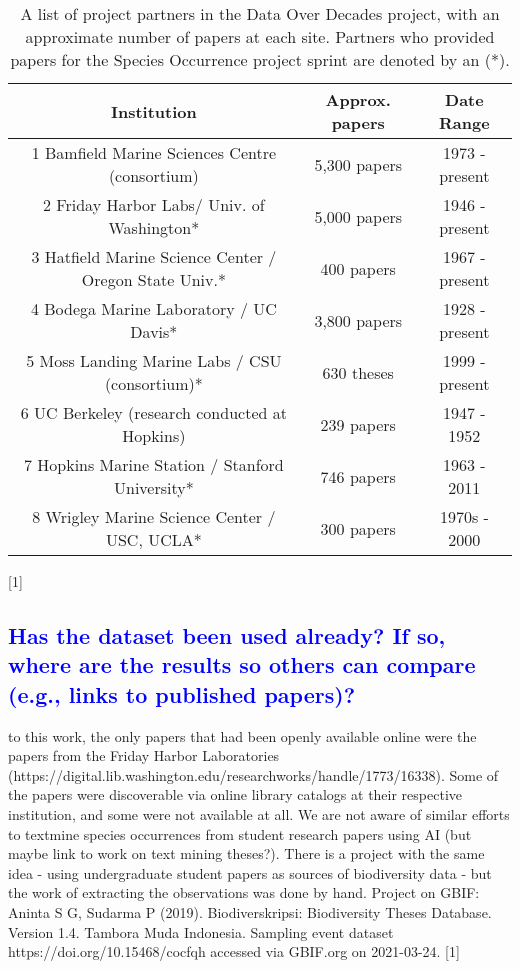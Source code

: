 \documentclass[letterpaper, 10 pt, conference]{ieeeconf}  %
\begin{document}
\begin{table}[h!]
\centering
 \begin{tabular}{||c c c||} 
 \hline
 Institution & Approx. papers & Date Range \\ [0.5ex] 
 \hline\hline
1 Bamfield Marine Sciences Centre (consortium) & 5,300 papers & 1973 - present \\
\hline
2 Friday Harbor Labs/ Univ. of Washington* & 5,000 papers & 1946 - present \\
\hline
3 Hatfield Marine Science Center / Oregon State Univ.* & 400 papers & 1967 - present \\
\hline
4 Bodega Marine Laboratory / UC Davis* & 3,800 papers & 1928 - present \\
\hline
5 Moss Landing Marine Labs / CSU (consortium)* & 630 theses & 1999 - present \\
\hline
6 UC Berkeley (research conducted at Hopkins) & 239 papers & 1947 - 1952 \\ 
\hline
7 Hopkins Marine Station / Stanford University* & 746 papers & 1963 - 2011 \\
\hline
8 Wrigley Marine Science Center / USC, UCLA* & 300 papers & 1970s - 2000 \\
\hline
\end{tabular}
\caption{A list of project partners in the Data Over Decades project, with an approximate number of papers at each site. Partners who provided papers for the Species Occurrence project sprint are denoted by an (*).}
\label{table:1}
\end{table}
[1]

\textcolor{blue}{\subsection{Has the dataset been used already? If so, where are the results so others can compare
(e.g., links to published papers)?}}

\Prior to this work, the only papers that had been openly available online were the papers from the Friday Harbor Laboratories (https://digital.lib.washington.edu/researchworks/handle/1773/16338). Some of the papers were discoverable via online library catalogs at their respective institution, and some were not available at all. We are not aware of similar efforts to textmine species occurrences from student research papers using AI (but maybe link to work on text mining theses?). There is a project with the same idea - using undergraduate student papers as sources of biodiversity data - but the work of extracting the observations was done by hand. Project on GBIF: Aninta S G, Sudarma P (2019). Biodiverskripsi: Biodiversity Theses Database. Version 1.4. Tambora Muda Indonesia. Sampling event dataset https://doi.org/10.15468/cocfqh accessed via GBIF.org on 2021-03-24.  [1]
\end{document}
